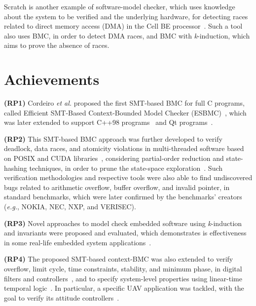 \documentclass{acm_sen_article}
\begin{document}
Scratch is another example of software-model checker, which uses knowledge about the system to be verified and the underlying hardware, for detecting races related to direct memory access (DMA) in the Cell BE processor~\cite{Donaldson10}. Such a tool also uses BMC, in order to detect DMA races, and BMC with \textit{k}-induction, which aims to prove the absence of races.


\section{Achievements}
\label{achievements}

\textbf{(RP1)} Cordeiro {\it et al.} proposed the first SMT-based BMC for full C programs, called Efficient SMT-Based Context-Bounded Model Checker (ESBMC)~\cite{Cordeiro12}, which was later extended to support C++98 programs~\cite{ECBS13} and Qt programs~\cite{Sousa15}. 

\textbf{(RP2)} This SMT-based BMC approach was further developed to verify deadlock, data races, and atomicity violations in multi-threaded software based on POSIX and CUDA libraries~\cite{CordeiroF11,Pereira15}, considering partial-order reduction and state-hashing techniques, in order to prune the state-space exploration~\cite{morse15}. Such verification methodologies and respective tools were also able to find undiscovered bugs related to arithmetic overflow, buffer overflow, and invalid pointer, in standard benchmarks, which were later confirmed by the benchmarks' creators ({\it e.g.}, NOKIA, NEC, NXP, and VERISEC). 

\textbf{(RP3)} Novel approaches to model check embedded software using \textit{k}-induction and invariants were proposed and evaluated, which demonstrates is effectiveness in some real-life embedded system applications~\cite{Gadelha15,Rocha15}. 

\textbf{(RP4)} The proposed SMT-based context-BMC was also extended to verify overflow, limit cycle, time constraints, stability, and minimum phase, in digital filters and controllers~\cite{dsv_spin2015,esbmc_controller,esbmc_filter}, and to specify system-level properties using linear-time temporal logic~\cite{JMorse15}. In particular, a specific UAV application was tackled, with the goal to verify its attitude controllers~\cite{Bessa16}. 
\end{document}
